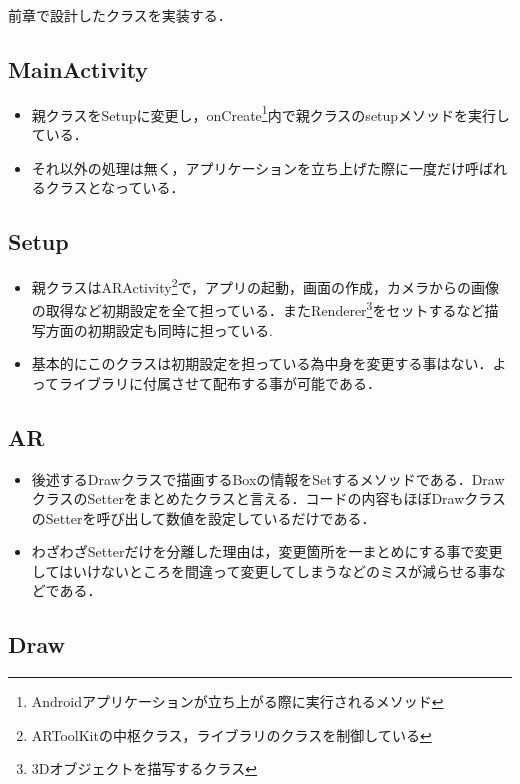前章で設計したクラスを実装する．
\subsection{MainActivity}

\begin{itemize}
 \item 親クラスをSetupに変更し，onCreate\footnote{Androidアプリケーションが立ち上がる際に実行されるメソッド}内で親クラスのsetupメソッドを実行している．
 \item それ以外の処理は無く，アプリケーションを立ち上げた際に一度だけ呼ばれるクラスとなっている．
\end{itemize}

\subsection{Setup}
\begin{itemize}
 \item 親クラスはARActivity\footnote{ARToolKitの中枢クラス，ライブラリのクラスを制御している}で，アプリの起動，画面の作成，カメラからの画像の取得など初期設定を全て担っている．またRenderer\footnote{3Dオブジェクトを描写するクラス}をセットするなど描写方面の初期設定も同時に担っている.
 \item 基本的にこのクラスは初期設定を担っている為中身を変更する事はない．よってライブラリに付属させて配布する事が可能である．
\end{itemize}

\subsection{AR}
\begin{itemize}
 \item 後述するDrawクラスで描画するBoxの情報をSetするメソッドである．DrawクラスのSetterをまとめたクラスと言える．コードの内容もほぼDrawクラスのSetterを呼び出して数値を設定しているだけである．
 \item わざわざSetterだけを分離した理由は，変更箇所を一まとめにする事で変更してはいけないところを間違って変更してしまうなどのミスが減らせる事などである．
\end{itemize}

\subsection{Draw}

